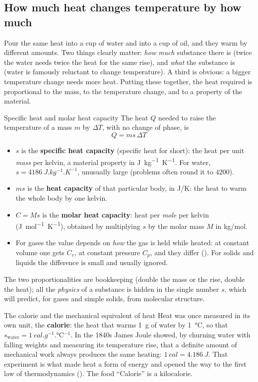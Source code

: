 \subsection{How much heat changes temperature by how much}

Pour the same heat into a cup of water and into a cup of oil, and they warm by different amounts. Two
things clearly matter: \emph{how much} substance there is (twice the water needs twice the heat for the
same rise), and \emph{what} the substance is (water is famously reluctant to change temperature). A
third is obvious: a bigger temperature change needs more heat. Putting these together, the heat
required is proportional to the mass, to the temperature change, and to a property of the material.

\begin{defbox}{Specific heat and molar heat capacity}
The heat $Q$ needed to raise the temperature of a mass $m$ by $\Delta T$, with no change of phase, is
\[
\boxed{\;Q = ms\,\Delta T\;}
\]
\begin{itemize}
\item $s$ is the \textbf{specific heat capacity} (specific heat for short): the heat per unit
      \emph{mass} per kelvin, a material property in \si{J.kg^{-1}.K^{-1}}. For water,
      $s = \SI{4186}{J.kg^{-1}.K^{-1}}$, unusually large (problems often round it to $4200$).
\item $ms$ is the \textbf{heat capacity} of that particular body, in \si{J/K}: the heat to warm the
      whole body by one kelvin.
\item $C = Ms$ is the \textbf{molar heat capacity}: heat per \emph{mole} per kelvin
      (\si{J.mol^{-1}.K^{-1}}), obtained by multiplying $s$ by the molar mass $M$ in \si{kg/mol}.
\item For gases the value depends on \emph{how} the gas is held while heated: at constant volume one
      gets $C_v$, at constant pressure $C_p$, and they differ (). For solids and
      liquids the difference is small and usually ignored.
\end{itemize}
The two proportionalities are bookkeeping (double the mass or the rise, double the heat); all the
\emph{physics} of a substance is hidden in the single number $s$, which  will
predict, for gases and simple solids, from molecular structure.
\end{defbox}

\begin{remarkbox}{The calorie and the mechanical equivalent of heat}
Heat was once measured in its own unit, the \textbf{calorie}: the heat that warms \SI{1}{g} of water by
\SI{1}{\celsius}, so that $s_{\text{water}}=\SI{1}{cal.g^{-1}.\celsius^{-1}}$. In the 1840s James Joule
showed, by churning water with falling weights and measuring its temperature rise, that a definite
amount of mechanical work always produces the same heating: $\SI{1}{cal}=\SI{4.186}{J}$. That
experiment is what made heat a form of energy and opened the way to the first law of thermodynamics
(). The food ``Calorie'' is a kilocalorie.
\end{remarkbox}

